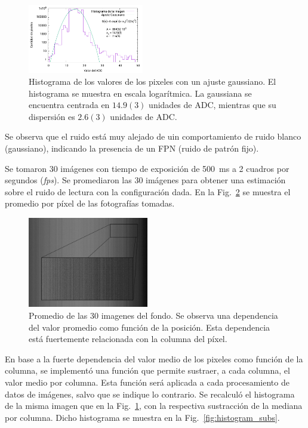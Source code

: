 \documentclass[twoside,twocolumn]{article}
\begin{document}
      \begin{figure}[h]
        \includegraphics[width=0.45\textwidth]{figures/background_histo.pdf}
        \caption{Histograma de los valores de los pixeles con un ajuste gaussiano.
          El histograma se muestra en escala logarítmica.
          La gaussiana se encuentra centrada en $14.9(3)$ unidades de ADC,
          mientras que su dispersión es $2.6(3)$ unidades de ADC.}
        \label{fig:histogram}
      \end{figure}

      Se observa que el ruido está muy alejado de uin comportamiento de ruido blanco (gaussiano),
      indicando la presencia de un FPN (ruido de patrón fijo).
      
      Se tomaron 30 imágenes con tiempo de exposición de \SI{500}{\milli\second} a 2 cuadros por segundos (\emph{fps}).
      Se promediaron las 30 imágenes para obtener una estimación sobre el ruido de lectura con la configuración dada. 
      En la Fig.~\ref{fig:background} se muestra el promedio por píxel de las fotografías tomadas.

      \begin{figure}[h]
        \includegraphics[width=0.47\textwidth]{figures/background.jpg}
        \caption{Promedio de las 30 imagenes del fondo. 
          Se observa una dependencia del valor promedio como función de la posición.
          Esta dependencia está fuertemente relacionada con la columna del píxel. }
        \label{fig:background}
      \end{figure}
    
      En base a la fuerte dependencia del valor medio de los pixeles como función de la columna,
      se implementó una función que permite sustraer, a cada columna, el valor medio por columna.
      Esta función será aplicada a cada procesamiento de datos de imágenes, salvo que se indique lo contrario.
      Se recalculó el histograma de la misma imagen que en la Fig.~\ref{fig:histogram}, con la respectiva sustracción
      de la mediana por columna. Dicho histograma se muestra en la Fig.~\ref{fig:histogram_subs}.
\end{document}
